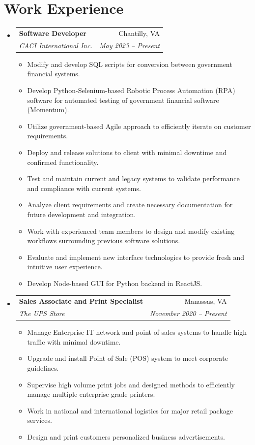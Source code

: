 \documentclass[letterpaper,11pt]{article}
\makeatletter
\newcommand{\resumeItem}[1]{
  \item\small{
    {#1 \vspace{-1pt}}
  }
}
\newcommand{\resumeSubheading}[4]{
  \vspace{-1pt}\item
    \begin{tabular*}{0.97\textwidth}[t]{l@{\extracolsep{\fill}}r}
      \textbf{#1} & #2 \\
      \textit{\small#3} & \textit{\small #4} \\
    \end{tabular*}\vspace{-5pt}
}
\newcommand{\resumeSubHeadingListStart}{\begin{itemize}[leftmargin=0.15in, label={}]}
\newcommand{\resumeSubHeadingListEnd}{\end{itemize}}
\newcommand{\resumeItemListStart}{\begin{itemize}}
\newcommand{\resumeItemListEnd}{\end{itemize}\vspace{-5pt}}
\makeatother
\begin{document}
\section{Work Experience}
  \resumeSubHeadingListStart

    \resumeSubheading
      {Software Developer}{Chantilly, VA}
      {CACI International Inc.}{May 2023 – Present}
      \resumeItemListStart
        \resumeItem{Modify and develop SQL scripts for conversion between government financial systems.}
        \resumeItem{Develop Python-Selenium-based Robotic Process Automation (RPA) software for automated testing of government financial software (Momentum).}
        \resumeItem{Utilize government-based Agile approach to efficiently iterate on customer requirements.}
        \resumeItem{Deploy and release solutions to client with minimal downtime and confirmed functionality.}
        \resumeItem{Test and maintain current and legacy systems to validate performance and compliance with current systems.}
        \resumeItem{Analyze client requirements and create necessary documentation for future development and integration.}
        \resumeItem{Work with experienced team members to design and modify existing workflows surrounding previous software solutions.}
        \resumeItem{Evaluate and implement new interface technologies to provide fresh and intuitive user experience.}
        \resumeItem{Develop Node-based GUI for Python backend in ReactJS.}
      \resumeItemListEnd

    \resumeSubheading
      {Sales Associate and Print Specialist}{Manassas, VA}
      {The UPS Store}{November 2020 – Present}
      \resumeItemListStart
        \resumeItem{Manage Enterprise IT network and point of sales systems to handle high traffic with minimal downtime.}
        \resumeItem{Upgrade and install Point of Sale (POS) system to meet corporate guidelines.}
        \resumeItem{Supervise high volume print jobs and designed methods to efficiently manage multiple enterprise grade printers.}
        \resumeItem{Work in national and international logistics for major retail package services.}
        \resumeItem{Design and print customers personalized business advertisements.}
      \resumeItemListEnd
      
    \resumeSubHeadingListEnd

%
\end{document}
